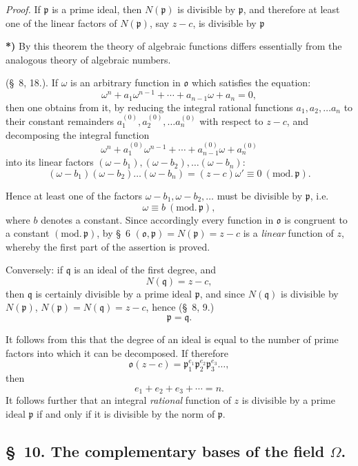 \documentclass{article}
\begin{document}
\emph{Proof.} If $\mathfrak{p}$ is a prime ideal, then $N(\mathfrak{p})$ is divisible by $\mathfrak{p}$, and therefore at least one of the linear factors of $N(\mathfrak{p})$, say $z-c$, is divisible by $\mathfrak{p}$

\textbf{*)} By this theorem the theory of algebraic functions differs essentially from the analogous theory of algebraic numbers.

(§~8, 18.). If $\omega$ is an arbitrary function in $\mathfrak{o}$ which satisfies the equation:
\[ \omega^{n} + a_{1}\omega^{n-1} + \cdots + a_{n-1}\omega + a_{n} = 0, \]
then one obtains from it, by reducing the integral rational functions $a_{1}, a_{2}, \ldots a_{n}$ to their constant remainders $a_{1}^{(0)}, a_{2}^{(0)}, \ldots a_{n}^{(0)}$ with respect to $z-c$, and decomposing the integral function
\[ \omega^{n} + a_{1}^{(0)}\omega^{n-1} + \cdots + a_{n-1}^{(0)}\omega + a_{n}^{(0)} \]
into its linear factors $(\omega-b_{1}), (\omega-b_{2}), \ldots (\omega-b_{n})$:
\[ (\omega-b_{1})(\omega-b_{2})\ldots(\omega-b_{n}) = (z-c)\omega' \equiv 0 \ (\text{mod.}\,\mathfrak{p}). \]

Hence at least one of the factors $\omega-b_{1}, \omega-b_{2}, \ldots$ must be divisible by $\mathfrak{p}$, i.e.\
\[ \omega \equiv b \ (\text{mod.}\,\mathfrak{p}), \]
where $b$ denotes a constant. Since accordingly every function in $\mathfrak{o}$ is congruent to a constant $(\text{mod.}\,\mathfrak{p})$, by §~6 $(\mathfrak{o}, \mathfrak{p}) = N(\mathfrak{p}) = z-c$ is a \emph{linear} function of $z$, whereby the first part of the assertion is proved.

Conversely: if $\mathfrak{q}$ is an ideal of the first degree, and
\[ N(\mathfrak{q}) = z-c, \]
then $\mathfrak{q}$ is certainly divisible by a prime ideal $\mathfrak{p}$, and since $N(\mathfrak{q})$ is divisible by $N(\mathfrak{p})$, $N(\mathfrak{p}) = N(\mathfrak{q}) = z-c$, hence (§~8, 9.)
\[ \mathfrak{p} = \mathfrak{q}. \]

It follows from this that the degree of an ideal is equal to the number of prime factors into which it can be decomposed. If therefore
\[ \mathfrak{o}(z-c) = \mathfrak{p}_{1}^{e_{1}}\mathfrak{p}_{2}^{e_{2}}\mathfrak{p}_{3}^{e_{3}}\ldots, \]
then
\[ e_{1} + e_{2} + e_{3} + \cdots = n. \]
It follows further that an integral \emph{rational} function of $z$ is divisible by a prime ideal $\mathfrak{p}$ if and only if it is divisible by the norm of $\mathfrak{p}$.

\subsection*{§~10. The complementary bases of the field $\Omega$.}
\end{document}
